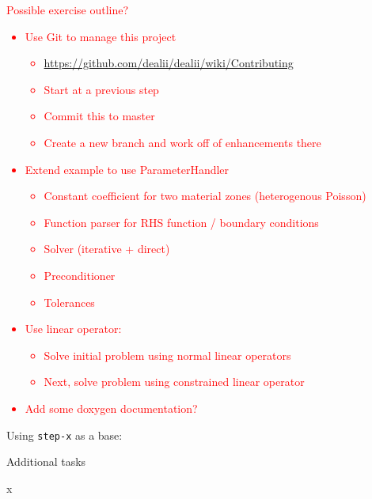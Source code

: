 \documentclass[11pt]{exam}
\newcommand{\FINISHME}[1]{\textcolor{red}{#1}}
\begin{document}
\begin{questions}

\question \FINISHME{Possible exercise outline?}
\FINISHME{
\begin{itemize}
\item Use Git to manage this project
  \begin{itemize}
  \item \url{https://github.com/dealii/dealii/wiki/Contributing}
  \item Start at a previous step
  \item Commit this to master
  \item Create a new branch and work off of enhancements there
  \end{itemize}
\item Extend example to use ParameterHandler
  \begin{itemize}
  \item Constant coefficient for two material zones (heterogenous Poisson)
  \item Function parser for RHS function / boundary conditions
  \item Solver (iterative + direct)
  \item Preconditioner
  \item Tolerances
  \end{itemize}
\item Use linear operator:
  \begin{itemize}
  \item Solve initial problem using normal linear operators
  \item Next, solve problem using constrained linear operator
  \end{itemize}
\item Add some doxygen documentation?
\end{itemize}
}

\question Using \verb|step-x| as a base:

\question Additional tasks
\begin{parts}
\bonuspart x
\end{parts}

\end{questions}


\end{document}
